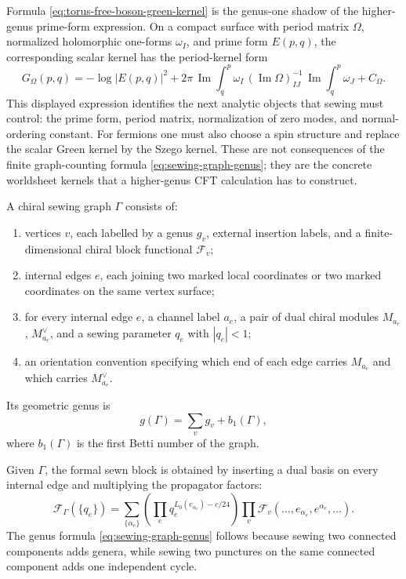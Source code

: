 \begin{example}
Formula \eqref{eq:torus-free-boson-green-kernel} is the genus-one shadow of the
higher-genus prime-form expression.  On a compact surface with period matrix
\(\Omega\), normalized holomorphic one-forms \(\omega_I\), and prime form
\(E(p,q)\), the corresponding scalar kernel has the period-kernel form
\[
  G_\Omega(p,q)
  =
  -\log |E(p,q)|^2
  +2\pi\,
   \operatorname{Im}\!\int_q^p\omega_I\,
   (\operatorname{Im}\Omega)^{-1}_{IJ}\,
   \operatorname{Im}\!\int_q^p\omega_J
  +C_\Omega .
\]
This displayed expression identifies the next analytic objects that sewing must
control: the prime form, period matrix, normalization of zero modes, and
normal-ordering constant.  For fermions one must also choose a spin structure
and replace the scalar Green kernel by the Szego kernel.  These are not
consequences of the finite graph-counting formula
\eqref{eq:sewing-graph-genus}; they are the concrete worldsheet kernels that a
higher-genus CFT calculation has to construct.
\end{example}

\begin{definition}
\label{def:chiral-sewing-graph}
A chiral sewing graph \(\Gamma\) consists of:
\begin{enumerate}
  \item vertices \(v\), each labelled by a genus \(g_v\), external insertion
  labels, and a finite-dimensional chiral block functional
  \(\mathcal F_v\);
  \item internal edges \(e\), each joining two marked local coordinates or
  two marked coordinates on the same vertex surface;
  \item for every internal edge \(e\), a channel label \(a_e\), a pair of
  dual chiral modules \(M_{a_e}\), \(M_{a_e}^\vee\), and a sewing parameter
  \(q_e\) with \(|q_e|<1\);
  \item an orientation convention specifying which end of each edge carries
  \(M_{a_e}\) and which carries \(M_{a_e}^\vee\).
\end{enumerate}
Its geometric genus is
\begin{equation}
  g(\Gamma)=
  \sum_v g_v+b_1(\Gamma),
  \label{eq:sewing-graph-genus}
\end{equation}
where \(b_1(\Gamma)\) is the first Betti number of the graph.
\end{definition}

Given \(\Gamma\), the formal sewn block is obtained by inserting a dual basis
on every internal edge and multiplying the propagator factors:
\begin{equation}
  \mathcal F_\Gamma(\{q_e\})
  =
  \sum_{\{\alpha_e\}}
  \left(
    \prod_{e}
    q_e^{L_0(e_{\alpha_e})-c/24}
  \right)
  \prod_v
  \mathcal F_v(\ldots,e_{\alpha_e},e^{\alpha_e},\ldots).
  \label{eq:sewing-graph-block}
\end{equation}
The genus formula \eqref{eq:sewing-graph-genus} follows because sewing two
connected components adds genera, while sewing two punctures on the same
connected component adds one independent cycle.

